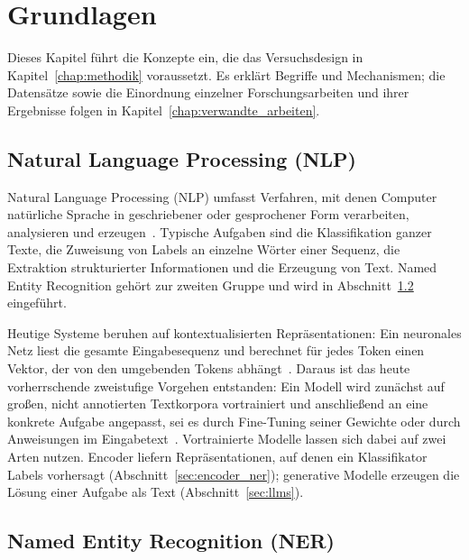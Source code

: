 %

\chapter{Grundlagen}
\label{chap:grundlagen}

Dieses Kapitel führt die Konzepte ein, die das Versuchsdesign in
Kapitel~\ref{chap:methodik} voraussetzt.
Es erklärt Begriffe und Mechanismen; die Datensätze sowie die
Einordnung einzelner Forschungsarbeiten und ihrer Ergebnisse folgen in
Kapitel~\ref{chap:verwandte_arbeiten}.

\section{Natural Language Processing (NLP)}
\label{sec:nlp}

Natural Language Processing (NLP) umfasst Verfahren, mit denen Computer
natürliche Sprache in geschriebener oder gesprochener Form verarbeiten,
analysieren und erzeugen~\cite{jurafsky2024speech,manning1999foundations}.
Typische Aufgaben sind die Klassifikation ganzer Texte, die Zuweisung von
Labels an einzelne Wörter einer Sequenz, die Extraktion strukturierter
Informationen und die Erzeugung von Text.
Named Entity Recognition gehört zur zweiten Gruppe und wird in
Abschnitt~\ref{sec:ner} eingeführt.

Heutige Systeme beruhen auf kontextualisierten Repräsentationen: Ein
neuronales Netz liest die gesamte Eingabesequenz und berechnet für jedes
Token einen Vektor, der von den umgebenden Tokens
abhängt~\cite{devlin2019bert}.
Daraus ist das heute vorherrschende zweistufige Vorgehen
entstanden: Ein Modell wird zunächst auf großen, nicht annotierten
Textkorpora vortrainiert und anschließend an eine konkrete Aufgabe
angepasst, sei es durch Fine-Tuning seiner Gewichte oder durch
Anweisungen im Eingabetext~\cite{devlin2019bert,brown2020language}.
Vortrainierte Modelle lassen sich dabei auf zwei Arten nutzen.
Encoder liefern Repräsentationen, auf denen ein Klassifikator Labels
vorhersagt (Abschnitt~\ref{sec:encoder_ner}); generative Modelle erzeugen
die Lösung einer Aufgabe als Text (Abschnitt~\ref{sec:llms}).

\section{Named Entity Recognition (NER)}
\label{sec:ner}

